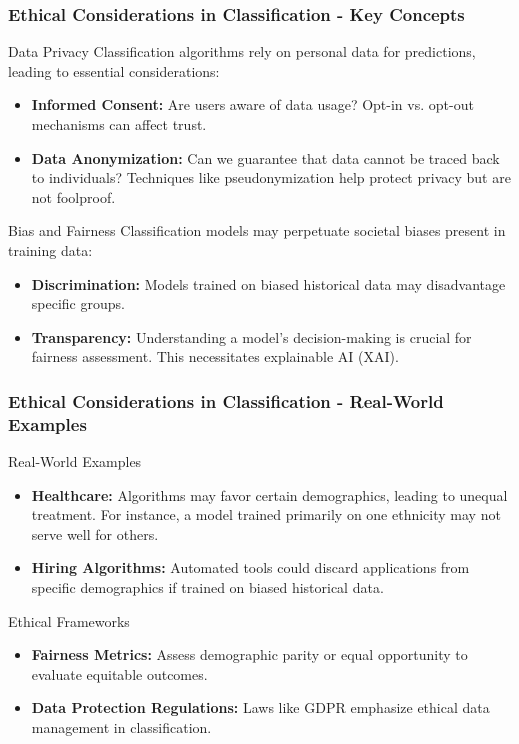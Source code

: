 \documentclass[aspectratio=169]{beamer}
\begin{document}
\begin{frame}[fragile]
    \frametitle{Ethical Considerations in Classification - Key Concepts}
    \begin{block}{Data Privacy}
        Classification algorithms rely on personal data for predictions, leading to essential considerations:
        \begin{itemize}
            \item \textbf{Informed Consent:} Are users aware of data usage? Opt-in vs. opt-out mechanisms can affect trust.
            \item \textbf{Data Anonymization:} Can we guarantee that data cannot be traced back to individuals? 
                  Techniques like pseudonymization help protect privacy but are not foolproof.
        \end{itemize}
    \end{block}

    \begin{block}{Bias and Fairness}
        Classification models may perpetuate societal biases present in training data:
        \begin{itemize}
            \item \textbf{Discrimination:} Models trained on biased historical data may disadvantage specific groups.
            \item \textbf{Transparency:} Understanding a model's decision-making is crucial for fairness assessment. This necessitates explainable AI (XAI).
        \end{itemize}
    \end{block}
\end{frame}

\begin{frame}[fragile]
    \frametitle{Ethical Considerations in Classification - Real-World Examples}
    \begin{block}{Real-World Examples}
        \begin{itemize}
            \item \textbf{Healthcare:} Algorithms may favor certain demographics, leading to unequal treatment. For instance, a model trained primarily on one ethnicity may not serve well for others.
            \item \textbf{Hiring Algorithms:} Automated tools could discard applications from specific demographics if trained on biased historical data.
        \end{itemize}
    \end{block}

    \begin{block}{Ethical Frameworks}
        \begin{itemize}
            \item \textbf{Fairness Metrics:} Assess demographic parity or equal opportunity to evaluate equitable outcomes.
            \item \textbf{Data Protection Regulations:} Laws like GDPR emphasize ethical data management in classification.
        \end{itemize}
    \end{block}
\end{frame}
\end{document}

